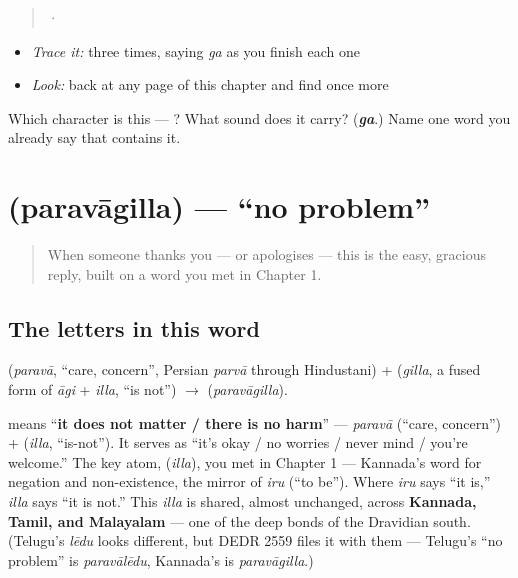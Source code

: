 \begin{quote}
  ·  
\end{quote}

\begin{itemize}
\raggedright
  \item \emph{Trace it:}  three times, saying \emph{ga} as you finish each one
  \item \emph{Look:} back at any page of this chapter and find  once more
\end{itemize}

\begin{tcolorbox}[breakable,colback=teal!4,colframe=teal!35!black,title={Before you move on}]
Which character is this — ? What sound does it carry? (\emph{\textbf{ga}}.) Name one word you already say that contains it.
\end{tcolorbox}
\section[\texorpdfstring{\kn{ಪರವಾಗಿಲ್ಲ} (paravāgilla)}{ಪರವಾಗಿಲ್ಲ (paravāgilla)}]{ (paravāgilla) — \textquotedblleft{}no problem\textquotedblright{}}

\label{lesson:KA-C03-paravaagilla}



\begin{quote}
When someone thanks you — or apologises — this is the easy, gracious reply, built on a word you met in Chapter 1.
\end{quote}

\subsection*{The letters in this word}
\textbf{} (\emph{paravā}, \textquotedblleft{}care, concern\textquotedblright{}, Persian \emph{parvā} through Hindustani) + \textbf{} (\emph{gilla}, a fused form of \emph{āgi} + \textbf{} \emph{illa}, \textquotedblleft{}is not\textquotedblright{}) $\to$ \textbf{} (\emph{paravāgilla}).

\begin{cousinweb}
\textbf{} means \textquotedblleft{}\textbf{it does not matter / there is no harm}\textquotedblright{} — \emph{paravā} (\textquotedblleft{}care, concern\textquotedblright{}) + \textbf{} (\emph{illa}, \textquotedblleft{}is-not\textquotedblright{}). It serves as \textquotedblleft{}it's okay / no worries / never mind / you're welcome.\textquotedblright{} The key atom, \textbf{} (\emph{illa}), you met in Chapter 1 — Kannada's word for negation and non-existence, the mirror of \emph{iru} (\textquotedblleft{}to be\textquotedblright{}). Where \emph{iru} says \textquotedblleft{}it is,\textquotedblright{} \emph{illa} says \textquotedblleft{}it is not.\textquotedblright{} This \emph{illa} is shared, almost unchanged, across \textbf{Kannada, Tamil, and Malayalam} — one of the deep bonds of the Dravidian south. (Telugu's \emph{lēdu} looks different, but DEDR 2559 files it with them — Telugu's \textquotedblleft{}no problem\textquotedblright{} is \emph{paravālēdu}, Kannada's is \emph{paravāgilla}.)
\end{cousinweb}

